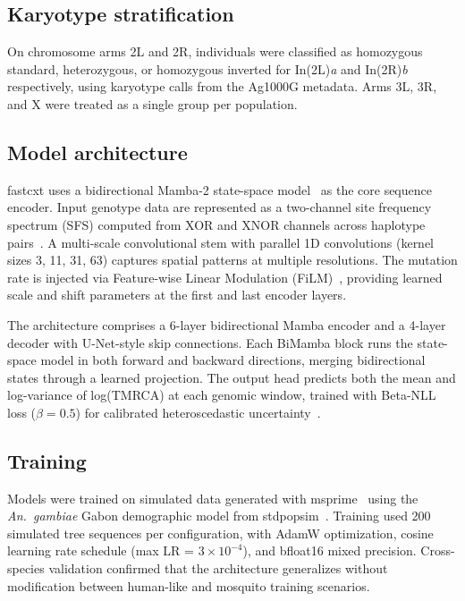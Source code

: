 \documentclass[10pt]{article}
\begin{document}
\subsection*{Karyotype stratification}

On chromosome arms 2L and 2R, individuals were classified as homozygous
standard, heterozygous, or homozygous inverted for In(2L)\textit{a} and
In(2R)\textit{b} respectively, using karyotype calls from the Ag1000G
metadata. Arms 3L, 3R, and X were treated as a single group per population.

\subsection*{Model architecture}

fastcxt uses a bidirectional Mamba-2 state-space model~\citep{gu2023mamba,
dao2024transformers} as the core sequence encoder. Input genotype data are
represented as a two-channel site frequency spectrum (SFS) computed from XOR
and XNOR channels across haplotype pairs~\citep{korfmann2025cxt}. A
multi-scale convolutional stem with parallel 1D convolutions (kernel sizes 3,
11, 31, 63) captures spatial patterns at multiple resolutions. The mutation
rate is injected via Feature-wise Linear Modulation
(FiLM)~\citep{perez2018film}, providing learned scale and shift parameters at
the first and last encoder layers.

The architecture comprises a 6-layer bidirectional Mamba encoder and a
4-layer decoder with U-Net-style skip connections. Each BiMamba block runs the
state-space model in both forward and backward directions, merging
bidirectional states through a learned projection. The output head predicts
both the mean and log-variance of log(TMRCA) at each genomic window, trained
with Beta-NLL loss ($\beta = 0.5$) for calibrated heteroscedastic
uncertainty~\citep{seitzer2022pitfalls}.

\subsection*{Training}

Models were trained on simulated data generated with msprime~\citep{kelleher2016efficient}
using the \textit{An.~gambiae} Gabon demographic model from
stdpopsim~\citep{stdpopsim2020catalog}. Training used 200 simulated tree
sequences per configuration, with AdamW optimization, cosine learning rate
schedule (max LR = $3 \times 10^{-4}$), and bfloat16 mixed precision.
Cross-species validation confirmed that the architecture generalizes without
modification between human-like and mosquito training scenarios.
\end{document}
